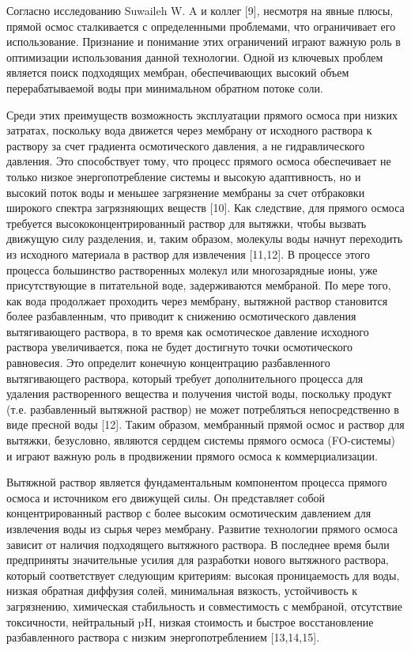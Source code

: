 Согласно исследованию Suwaileh W. A и коллег {[}9{]}, несмотря на явные
плюсы, прямой осмос сталкивается с определенными проблемами, что
ограничивает его использование. Признание и понимание этих ограничений
играют важную роль в оптимизации использования данной технологии. Одной
из ключевых проблем является поиск подходящих мембран, обеспечивающих
высокий объем перерабатываемой воды при минимальном обратном потоке
соли.

Среди этих преимуществ возможность эксплуатации прямого осмоса при
низких затратах, поскольку вода движется через мембрану от исходного
раствора к раствору за счет градиента осмотического давления, а не
гидравлического давления. Это способствует тому, что процесс прямого
осмоса обеспечивает не только низкое энергопотребление системы и высокую
адаптивность, но и высокий поток воды и меньшее загрязнение мембраны за
счет отбраковки широкого спектра загрязняющих веществ {[}10{]}. Как
следствие, для прямого осмоса требуется высококонцентрированный раствор
для вытяжки, чтобы вызвать движущую силу разделения, и, таким образом,
молекулы воды начнут переходить из исходного материала в раствор для
извлечения {[}11,12{]}. В процессе этого процесса большинство
растворенных молекул или многозарядные ионы, уже присутствующие в
питательной воде, задерживаются мембраной. По мере того, как вода
продолжает проходить через мембрану, вытяжной раствор становится более
разбавленным, что приводит к снижению осмотического давления
вытягивающего раствора, в то время как осмотическое давление исходного
раствора увеличивается, пока не будет достигнуто точки осмотического
равновесия. Это определит конечную концентрацию разбавленного
вытягивающего раствора, который требует дополнительного процесса для
удаления растворенного вещества и получения чистой воды, поскольку
продукт (т.е. разбавленный вытяжной раствор) не может потребляться
непосредственно в виде пресной воды {[}12{]}. Таким образом, мембранный
прямой осмос и раствор для вытяжки, безусловно, являются сердцем системы
прямого осмоса (FO-системы) и играют важную роль в продвижении прямого
осмоса к коммерциализации.

Вытяжной раствор является фундаментальным компонентом процесса прямого
осмоса и источником его движущей силы. Он представляет собой
концентрированный раствор с более высоким осмотическим давлением для
извлечения воды из сырья через мембрану. Развитие технологии прямого
осмоса зависит от наличия подходящего вытяжного раствора. В последнее
время были предприняты значительные усилия для разработки нового
вытяжного раствора, который соответствует следующим критериям: высокая
проницаемость для воды, низкая обратная диффузия солей, минимальная
вязкость, устойчивость к загрязнению, химическая стабильность и
совместимость с мембраной, отсутствие токсичности, нейтральный pH,
низкая стоимость и быстрое восстановление разбавленного раствора с
низким энергопотреблением {[}13,14,15{]}.

